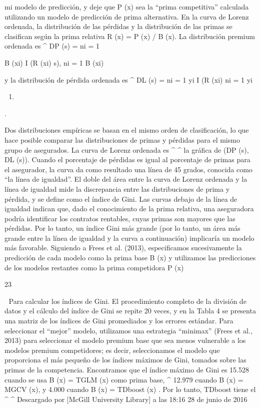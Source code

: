 \documentclass[]{article}
\begin{document}
mi modelo de predicción, y deje que P (x) sea la ``prima competitiva''
calculada utilizando un modelo de predicción de prima alternativa. En la
curva de Lorenz ordenada, la distribución de las pérdidas y la
distribución de las primas se clasifican según la prima relativa R (x) =
P (x) / B (x). La distribución premium ordenada es \^{} DP (s) = ni = 1

B (xi) I (R (xi) s), ni = 1 B (xi)

y la distribución de pérdida ordenada es \^{} DL (s) = ni = 1 yi I (R
(xi) ni = 1 yi

\begin{enumerate}
\def\labelenumi{\alph{enumi})}
\setcounter{enumi}{18}
\item
\end{enumerate}

.

Dos distribuciones empíricas se basan en el mismo orden de
clasificación, lo que hace posible comparar las distribuciones de primas
y pérdidas para el mismo grupo de asegurados. La curva de Lorenz
ordenada es \^{} \^{} la gráfica de (DP (s), DL (s)). Cuando el
porcentaje de pérdidas es igual al porcentaje de primas para el
asegurador, la curva da como resultado una línea de 45 grados, conocida
como ``la línea de igualdad''. El doble del área entre la curva de
Lorenz ordenada y la línea de igualdad mide la discrepancia entre las
distribuciones de prima y pérdida, y se define como el índice de Gini.
Las curvas debajo de la línea de igualdad indican que, dado el
conocimiento de la prima relativa, una aseguradora podría identificar
los contratos rentables, cuyas primas son mayores que las pérdidas. Por
lo tanto, un índice Gini más grande (por lo tanto, un área más grande
entre la línea de igualdad y la curva a continuación) implicaría un
modelo más favorable. Siguiendo a Frees et al. (2013), especificamos
sucesivamente la predicción de cada modelo como la prima base B (x) y
utilizamos las predicciones de los modelos restantes como la prima
competidora P (x)

23

 Para calcular los índices de Gini. El procedimiento completo de la
división de datos y el cálculo del índice de Gini se repite 20 veces, y
en la Tabla 4 se presenta una matriz de los índices de Gini promediados
y los errores estándar. Para seleccionar el ``mejor'' modelo, utilizamos
una estrategia ``minimax'' (Frees et al., 2013) para seleccionar el
modelo premium base que sea menos vulnerable a los modelos premium
competidores; es decir, seleccionamos el modelo que proporciona el más
pequeño de los índices máximos de Gini, tomados sobre las primas de la
competencia. Encontramos que el índice máximo de Gini es 15.528 cuando
se usa B (x) = TGLM (x) como prima base, \^{} 12.979 cuando B (x) = MGCV
(x), y 4.000 cuando B (x) = TDboost (x) . Por lo tanto, TDboost tiene el
\^{} \^{} Descargado por {[}McGill University Library{]} a las 18:16 28
de junio de 2016
\end{document}
